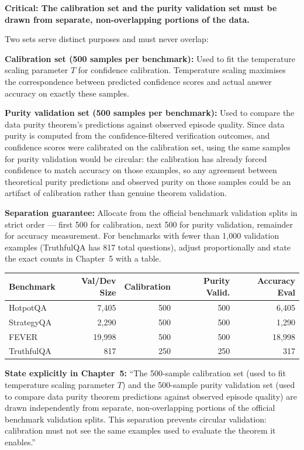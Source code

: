 \documentclass[12pt,a4paper]{article}
\theoremstyle{definition}
\begin{document}
\begin{designbox}
\textbf{Critical: The calibration set and the purity validation set must be drawn from separate, non-overlapping portions of the data.}

Two sets serve distinct purposes and must never overlap:

\textbf{Calibration set (500 samples per benchmark):} Used to fit the temperature scaling parameter $T$ for confidence calibration. Temperature scaling maximises the correspondence between predicted confidence scores and actual answer accuracy on exactly these samples.

\textbf{Purity validation set (500 samples per benchmark):} Used to compare the data purity theorem's predictions against observed episode quality. Since data purity is computed from the confidence-filtered verification outcomes, and confidence scores were calibrated on the calibration set, using the same samples for purity validation would be circular: the calibration has already forced confidence to match accuracy on those examples, so any agreement between theoretical purity predictions and observed purity on those samples could be an artifact of calibration rather than genuine theorem validation.

\textbf{Separation guarantee:} Allocate from the official benchmark validation splits in strict order --- first 500 for calibration, next 500 for purity validation, remainder for accuracy measurement. For benchmarks with fewer than 1,000 validation examples (TruthfulQA has 817 total questions), adjust proportionally and state the exact counts in Chapter~5 with a table.

\begin{center}
\small
\begin{tabular}{lrrrr}
\toprule
\textbf{Benchmark} & \textbf{Val/Dev Size} & \textbf{Calibration} & \textbf{Purity Valid.} & \textbf{Accuracy Eval} \\
\midrule
HotpotQA & 7,405 & 500 & 500 & 6,405 \\
StrategyQA & 2,290 & 500 & 500 & 1,290 \\
FEVER & 19,998 & 500 & 500 & 18,998 \\
TruthfulQA & 817 & 250 & 250 & 317 \\
\bottomrule
\end{tabular}
\end{center}

\textbf{State explicitly in Chapter~5:} ``The 500-sample calibration set (used to fit temperature scaling parameter $T$) and the 500-sample purity validation set (used to compare data purity theorem predictions against observed episode quality) are drawn independently from separate, non-overlapping portions of the official benchmark validation splits. This separation prevents circular validation: calibration must not see the same examples used to evaluate the theorem it enables.''
\end{designbox}
\end{document}
